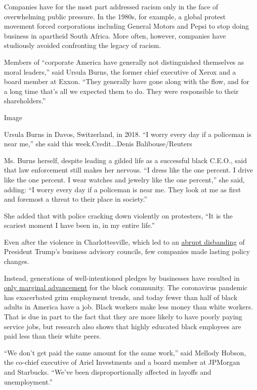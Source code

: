 Companies have for the most part addressed racism only in the face of
overwhelming public pressure. In the 1980s, for example, a global
protest movement forced corporations including General Motors and Pepsi
to stop doing business in apartheid South Africa. More often, however,
companies have studiously avoided confronting the legacy of racism.

Members of ``corporate America have generally not distinguished
themselves as moral leaders,'' said Ursula Burns, the former chief
executive of Xerox and a board member at Exxon. ``They generally have
gone along with the flow, and for a long time that's all we expected
them to do. They were responsible to their shareholders.''

Image

Ursula Burns in Davos, Switzerland, in 2018. ``I worry every day if a
policeman is near me,'' she said this week.Credit...Denis
Balibouse/Reuters

Ms. Burns herself, despite leading a gilded life as a successful black
C.E.O., said that law enforcement still makes her nervous. ``I dress
like the one percent. I drive like the one percent. I wear watches and
jewelry like the one percent,'' she said, adding: ``I worry every day if
a policeman is near me. They look at me as first and foremost a threat
to their place in society.''

She added that with police cracking down violently on protesters, ``It
is the scariest moment I have been in, in my entire life.''

Even after the violence in Charlottesville, which led to an
\href{https://www.nytimes3xbfgragh.onion/2017/08/16/business/trumps-council-ceos.html}{abrupt
disbanding} of President Trump's business advisory councils, few
companies made lasting policy changes.

Instead, generations of well-intentioned pledges by businesses have
resulted in
\href{https://www.nytimes3xbfgragh.onion/2020/06/01/business/economy/black-workers-inequality-economic-risks.html}{only
marginal advancement} for the black community. The coronavirus pandemic
has exacerbated grim employment trends, and today fewer than half of
black adults in America have a job. Black workers make less money than
white workers. That is due in part to the fact that they are more likely
to have poorly paying service jobs, but research also shows that highly
educated black employees are paid less than their white peers.

``We don't get paid the same amount for the same work,'' said Mellody
Hobson, the co-chief executive of Ariel Investments and a board member
at JPMorgan and Starbucks. ``We've been disproportionally affected in
layoffs and unemployment.''

